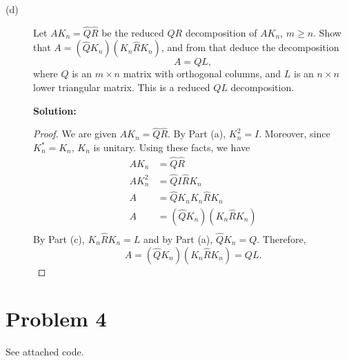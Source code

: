 \documentclass{article}
\begin{document}
\begin{description}
    \item[(d)] Let $AK_n = \hat{Q}\hat{R}$ be the reduced $QR$ decomposition of $AK_n$, $m \geq n$. Show that $A = (\hat{Q}K_n)(K_n\hat{R}K_n)$, and from that deduce the decomposition \[A = QL,\] where $Q$ is an $m \times n$ matrix with orthogonal columns, and $L$ is an $n \times n$ lower triangular matrix. This is a reduced $QL$ decomposition.
    
    \textbf{Solution:}
    \begin{proof}
    We are given $AK_n = \hat{Q}\hat{R}$. By Part (a), $K_n^2 = I$. Moreover, since $K_n^* = K_n$, $K_n$ is unitary. Using these facts, we have
    \begin{align*}
        AK_n &= \hat{Q}\hat{R}\\
        AK_n^2 &= \hat{Q}I\hat{R}K_n\\
        A &= \hat{Q}K_nK_n\hat{R}K_n\\
        A &= (\hat{Q}K_n)(K_n\hat{R}K_n)\\
    \end{align*}
        By Part (c), $K_n\hat{R}K_n = L$ and by Part (a), $\hat{Q}K_n = Q$. Therefore,
        \[ A = (\hat{Q}K_n)(K_n\hat{R}K_n) = QL. \]
    \end{proof}

\end{description}

\pagebreak

\section*{Problem 4}
See attached code.
\end{document}

